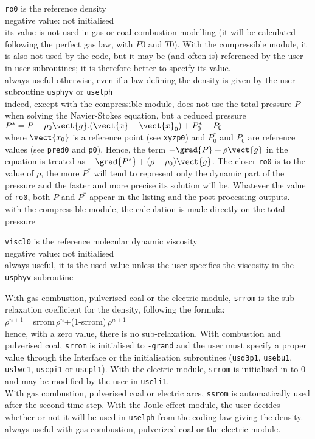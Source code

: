 {{\tt ro0} is the reference density\\
negative value: not initialised\\
its value is not used in gas or coal combustion modelling (it
will be calculated following the perfect gas law, with $P0$ and $T0$). With the
compressible module, it is also not used by the code, but it may be (and often
is) referenced by the user in user subroutines; it is therefore better to
specify its value.\\
always useful otherwise, even if a law defining the density is given by
the user subroutine \texttt{usphyv} or \texttt{uselph}\\
indeed, except with the
compressible module, \CS does not
use the total pressure $P$ when solving the Navier-Stokes equation, but a
reduced pressure \\
$P^*=P-\rho_0\vect{g}.(\vect{x}-\vect{x}_0)+P^*_0-P_0$\\
where
$\vect{x_0}$ is a reference point (see {\tt xyzp0}) and $P^*_0$ and $P_0$ are
reference values (see {\tt pred0} and {\tt p0}). Hence, the term
$-\grad{P}+\rho\vect{g}$ in the equation is treated as
$-\grad{P^*}+(\rho-\rho_0)\vect{g}$. The closer {\tt ro0} is to the value of $\rho$,
the more $P^*$ will tend to represent only the dynamic part of the pressure and
the faster and more precise its solution will be. Whatever the value of {\tt ro0},
both $P$ and $P^*$ appear in the listing and the post-processing outputs.\\
with the compressible module, the calculation is made directly on the total
pressure}

{ {\tt viscl0} is the reference molecular dynamic
viscosity\\
negative value: not initialised\\
always useful, it is the used value unless the user specifies the
viscosity in the \texttt{usphyv}} subroutine

{With gas combustion, pulverised coal or the electric module, {\tt srrom}
 is the sub-relaxation coefficient for the density, following the formula:\\
$\rho^{n+1}$\,=\,srrom\,$\rho^n$+(1-srrom)\,$\rho^{n+1}$\\
hence, with a zero value, there is no sub-relaxation.
With combustion and pulverised coal, {\tt srrom} is initialised to {\tt -grand}
and the user must specify a proper value through the Interface or the
initialisation subroutines (\texttt{usd3p1},
 \texttt{usebu1}, \texttt{uslwc1}, \texttt{uscpi1} or
\texttt{uscpl1}). With the electric module, {\tt srrom} is initialised in to 0
and may be modified by the user in \texttt{useli1}.\\
With gas combustion, pulverised coal or electric arcs, {\tt ssrom} is
automatically used after the second time-step. With the Joule effect module,
the user decides whether or not it will be used in \texttt{uselph}
from the coding law giving the density.}\\
always useful with gas combustion, pulverized coal or the electric module.

